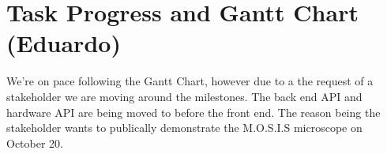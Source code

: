 \section{Task Progress and Gantt Chart (Eduardo)}
We're on pace following the Gantt Chart, however due to a the request of a stakeholder we are moving around the milestones. The back end API and hardware API are being moved to before the front end. The reason being the stakeholder wants to publically demonstrate the M.O.S.I.S microscope on October 20.